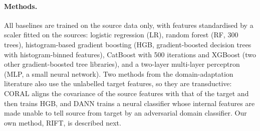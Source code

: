 \documentclass[11pt]{article}
\begin{document}
\paragraph{Methods.}\label{sec:benchmeth}
All baselines are trained on the source data only, with features standardised by a scaler fitted on the sources: logistic regression (LR), random forest (RF, 300 trees), histogram-based gradient boosting (HGB, gradient-boosted decision trees with histogram-binned features), CatBoost \citep{prokhorenkova2018catboost} with 500 iterations and XGBoost (two other gradient-boosted tree libraries), and a two-layer multi-layer perceptron (MLP, a small neural network).
Two methods from the domain-adaptation literature also use the unlabelled target features, so they are transductive: CORAL \citep{sun2016coral} aligns the covariance of the source features with that of the target and then trains HGB, and DANN \citep{ganin2016dann} trains a neural classifier whose internal features are made unable to tell source from target by an adversarial domain classifier.
Our own method, RIFT, is described next.
\end{document}
